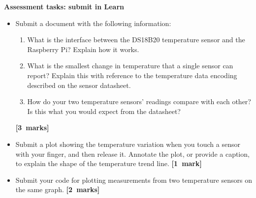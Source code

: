 \newpage
{\bf Assessment tasks: submit in Learn}

\begin{itemize}

\item Submit a document with the following information:
\begin{enumerate}
\item What is the interface between the DS18B20 temperature sensor and the Raspberry Pi?
Explain how it works.
\item What is the smallest change in temperature that a single sensor can report?
Explain this with reference to the temperature data encoding described on the sensor datasheet.
\item How do your two temperature sensors' readings compare with each other?
Is this what you would expect from the datasheet?
\end{enumerate}
\hfill {\bf[3~marks]}

\item Submit a plot showing the temperature variation when you touch a sensor with your finger, and then release it.
Annotate the plot, or provide a caption, to explain the shape of the temperature trend line.
\hfill {\bf[1~mark]}

\item Submit your code for plotting measurements from two temperature sensors on the same graph.
\hfill {\bf[2~marks]}

\end{itemize}
